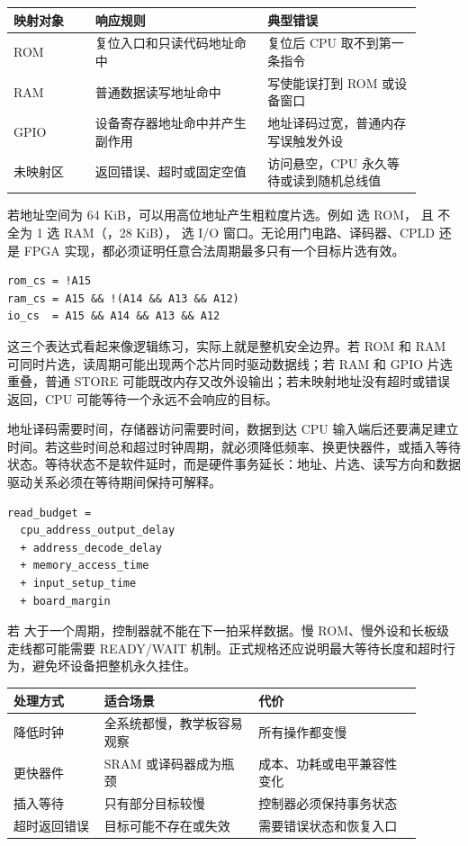 \begin{longtable}{L{0.18\linewidth}L{0.38\linewidth}L{0.34\linewidth}}
\toprule
映射对象 & 响应规则 & 典型错误 \\
\midrule
ROM & 复位入口和只读代码地址命中 & 复位后 CPU 取不到第一条指令 \\
RAM & 普通数据读写地址命中 & 写使能误打到 ROM 或设备窗口 \\
GPIO & 设备寄存器地址命中并产生副作用 & 地址译码过宽，普通内存写误触发外设 \\
未映射区 & 返回错误、超时或固定空值 & 访问悬空，CPU 永久等待或读到随机总线值 \\
\bottomrule
\end{longtable}

若地址空间为 64 KiB，可以用高位地址产生粗粒度片选。例如  选 ROM， 且  不全为 1 选 RAM（，28 KiB）， 选 I/O 窗口。无论用门电路、译码器、CPLD 还是 FPGA 实现，都必须证明任意合法周期最多只有一个目标片选有效。

\begin{lstlisting}
rom_cs = !A15
ram_cs = A15 && !(A14 && A13 && A12)
io_cs  = A15 && A14 && A13 && A12
\end{lstlisting}

这三个表达式看起来像逻辑练习，实际上就是整机安全边界。若 ROM 和 RAM 可同时片选，读周期可能出现两个芯片同时驱动数据线；若 RAM 和 GPIO 片选重叠，普通 STORE 可能既改内存又改外设输出；若未映射地址没有超时或错误返回，CPU 可能等待一个永远不会响应的目标。

地址译码需要时间，存储器访问需要时间，数据到达 CPU 输入端后还要满足建立时间。若这些时间总和超过时钟周期，就必须降低频率、换更快器件，或插入等待状态。等待状态不是软件延时，而是硬件事务延长：地址、片选、读写方向和数据驱动关系必须在等待期间保持可解释。

\begin{lstlisting}
read_budget =
  cpu_address_output_delay
  + address_decode_delay
  + memory_access_time
  + input_setup_time
  + board_margin
\end{lstlisting}

若  大于一个周期，控制器就不能在下一拍采样数据。慢 ROM、慢外设和长板级走线都可能需要 READY/WAIT 机制。正式规格还应说明最大等待长度和超时行为，避免坏设备把整机永久挂住。

\begin{longtable}{L{0.2\linewidth}L{0.34\linewidth}L{0.36\linewidth}}
\toprule
处理方式 & 适合场景 & 代价 \\
\midrule
降低时钟 & 全系统都慢，教学板容易观察 & 所有操作都变慢 \\
更快器件 & SRAM 或译码器成为瓶颈 & 成本、功耗或电平兼容性变化 \\
插入等待 & 只有部分目标较慢 & 控制器必须保持事务状态 \\
超时返回错误 & 目标可能不存在或失效 & 需要错误状态和恢复入口 \\
\bottomrule
\end{longtable}

